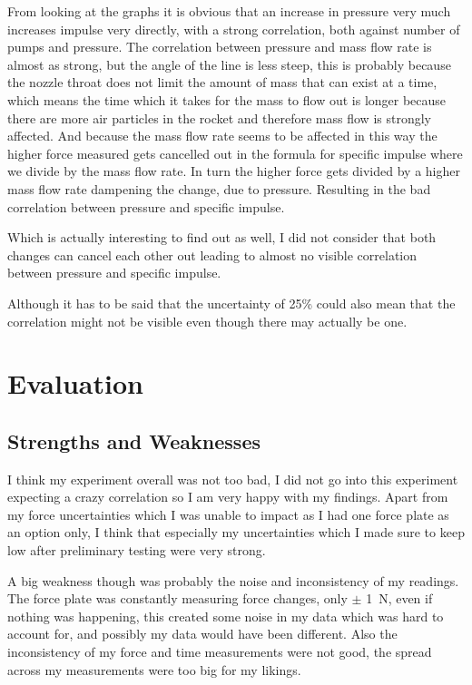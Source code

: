 \documentclass[12pt,a4paper]{article}
\begin{document}
From looking at the graphs it is obvious that an increase in pressure very much increases impulse very directly, with a strong correlation, both against number of pumps and pressure. The correlation between pressure and mass flow rate is almost as strong, but the angle of the line is less steep, this is probably because the nozzle throat does not limit the amount of mass that can exist at a time, which means the time which it takes for the mass to flow out is longer because there are more air particles in the rocket and therefore mass flow is strongly affected. And because the mass flow rate seems to be affected in this way the higher force measured gets cancelled out in the formula for specific impulse where we divide by the mass flow rate. In turn the higher force gets divided by a higher mass flow rate dampening the change, due to pressure. Resulting in the bad correlation between pressure and specific impulse.

Which is actually interesting to find out as well, I did not consider that both changes can cancel each other out leading to almost no visible correlation between pressure and specific impulse.

Although it has to be said that the uncertainty of 25\% could also mean that the correlation might not be visible even though there may actually be one.

\section{Evaluation}

\subsection{Strengths and Weaknesses}

I think my experiment overall was not too bad, I did not go into this experiment expecting a crazy correlation so I am very happy with my findings. Apart from my force uncertainties which I was unable to impact as I had one force plate as an option only, I think that especially my uncertainties which I made sure to keep low after preliminary testing were very strong.

A big weakness though was probably the noise and inconsistency of my readings. The force plate was constantly measuring force changes, only $\pm$ \SI{1}{\newton}, even if nothing was happening, this created some noise in my data which was hard to account for, and possibly my data would have been different. Also the inconsistency of my force and time measurements were not good, the spread across my measurements were too big for my likings.
\end{document}
